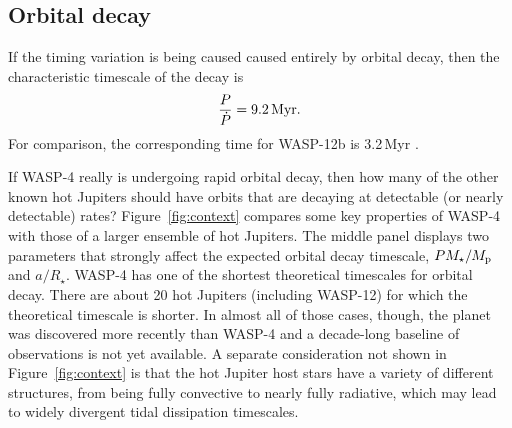 \documentclass[12pt,twocolumn,tighten]{aastex62}
\begin{document}
 
\subsection{Orbital decay}

If the timing variation is being caused caused entirely by orbital
decay, then the characteristic timescale of the decay is
\begin{equation}
  \frac{P}{ \dot{P} } = 9.2 \, {\rm Myr}.
\end{equation}
For comparison, the corresponding time for WASP-12b is 3.2\,Myr
\citep{patra_2017}.

If WASP-4 really is undergoing rapid orbital decay, then how many of
the other known hot Jupiters should have orbits that are decaying at
detectable (or nearly detectable) rates?  Figure~\ref{fig:context}
compares some key properties of WASP-4 with those of a larger ensemble
of hot Jupiters.  The middle panel displays two parameters that
strongly affect the expected orbital decay timescale, $P
M_\star/M_{\rm p}$ and $a/R_\star$.  WASP-4 has one of the shortest
theoretical timescales for orbital decay.  There are about 20 hot
Jupiters (including WASP-12) for which the theoretical timescale is
shorter.  In almost all of those cases, though, the planet was
discovered more recently than WASP-4 and a decade-long baseline of
observations is not yet available.  A separate consideration not shown
in Figure~\ref{fig:context} is that the hot Jupiter host stars have a
variety of different structures, from being fully convective to nearly
fully radiative, which may lead to widely divergent tidal dissipation
timescales.
\end{document}
